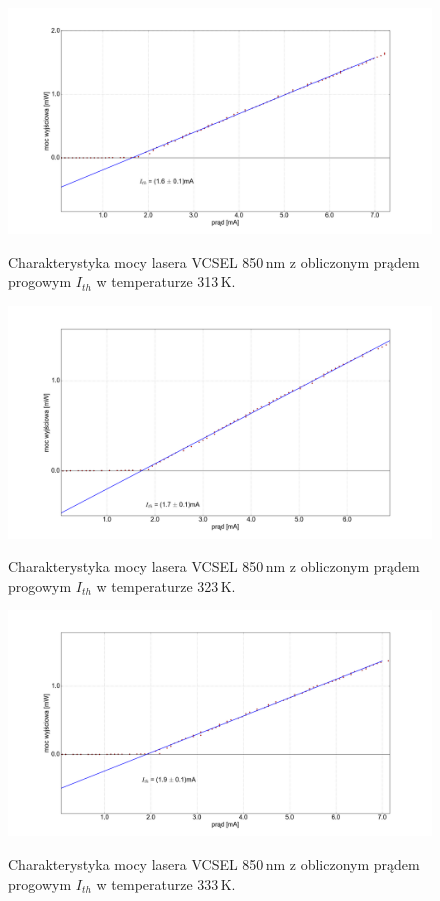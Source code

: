 \documentclass[a4paper, portrait,12pt]{report}
\begin{document}
\begin{figure}
\center
  \includegraphics[scale=0.30]{plot_vcsel850/temp_40_fit.png}
  \label{rys1}
  \caption{Charakterystyka mocy lasera VCSEL 850\,nm z obliczonym prądem progowym $I_{th}$ w temperaturze 313\,K.} 
\end{figure}

\begin{figure}
\center
  \includegraphics[scale=0.30]{plot_vcsel850/temp_50_fit.png}
  \label{rys1}
  \caption{Charakterystyka mocy lasera VCSEL 850\,nm z obliczonym prądem progowym $I_{th}$ w temperaturze 323\,K.} 
\end{figure}

\begin{figure}
\center
  \includegraphics[scale=0.30]{plot_vcsel850/temp_60_fit.png}
  \label{rys1}
  \caption{Charakterystyka mocy lasera VCSEL 850\,nm z obliczonym prądem progowym $I_{th}$ w temperaturze 333\,K.} 
\end{figure}
\end{document}
